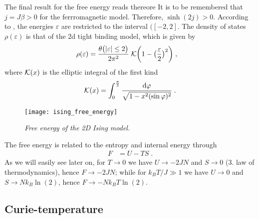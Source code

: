 The final result for the free energy reads thereore
%
%
It is to be remembered that $j =J\beta>0$ for the ferrromagnetic model. Therefore, $\sinh(2j)>0$.
According to , the energies $\varepsilon$ are restricted to the interval $([-2,2]$.
The density of states $\rho(\varepsilon)$ is that of the 2d tight binding model, which is given by
%
\begin{align}
\rho(\varepsilon)  &= \frac{\theta\big( \abs{\varepsilon}\le 2 \big)}{2\pi^{2}}\;{\cal K}\bigg( 1-\big(\frac{\varepsilon}{2}\big)^{2} \bigg)\;,
\end{align}
%
where ${\cal K}(x)$ is the elliptic integral of the first kind
%
\begin{align}\label{eq:}
{\cal K}(x) = \int_0^{\frac{\pi}{2}} \frac {\mathrm d\varphi}{\sqrt{1 - x^2(\sin \varphi)^2}}\;.
\end{align}
%
%
\begin{figure}[t]
\begin{center}
\texttt{[image: ising\_free\_energy]}
\caption{{\it Free energy of the 2D Ising model.}}
\end{center}
\end{figure}
%
The free energy is related to the entropy and internal energy through
%
\begin{align*}
F &= U -T S\;.
\end{align*}
%
As we will easily see later on, for $T\to 0$ we have $U\to -2 J N$
and $S\to 0$  (3. law of thermodynamics), hence $F\to -2 J N$;
while for $k_{B}T/J \gg 1$ we have $U\to 0$
and $S\to N k_{B} \ln(2)$, hence $F\to - N k_{B} T \ln(2)$.

\subsection{Curie-temperature}

